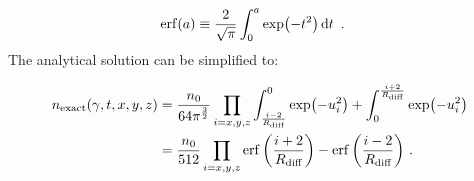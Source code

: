 \begin{equation}
    \begin{aligned}
    \erf(a)&\equiv \frac{2}{\sqrt{\pi}}\int_{0}^{a}\exp(-t^2)\dd{t}\text{ .} 
    \end{aligned}
\end{equation}
\noindent The analytical solution can be simplified to:

\begin{equation}
	\begin{aligned}
		n_\text{exact}\qty(\gamma,t,x,y,z)&=\frac{n_0}{64\pi^{\frac{3}{2}}}\prod_{i=x,y,z}\int_{\frac{i-2}{R_\text{diff}}}^0\exp(-u_i^2) + \int_{0}^{\frac{i+2}{R_\text{diff}}}\exp(-u_i^2) \\
		&=\frac{n_0}{512} \prod_{i=x,y,z} \erf\qty(\frac{i+2}{R_\text{diff}})-\erf\qty(\frac{i-2}{R_\text{diff}})\text{ .} 
	\end{aligned} \label{eq:chapter_9_multizone_diff_exact_sol}
\end{equation} 


